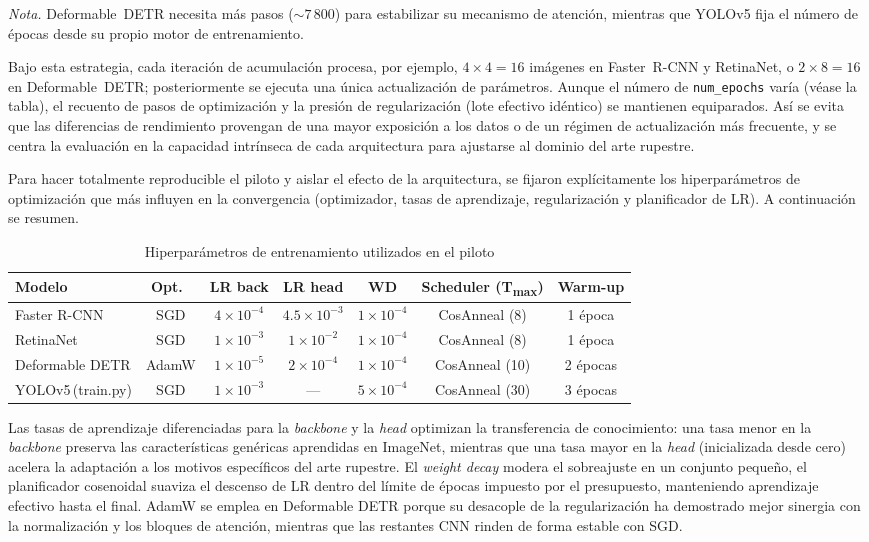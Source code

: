 \noindent\small
\textit{Nota.} Deformable~DETR necesita más pasos (\(\sim 7\,800\)) para estabilizar su mecanismo de atención, mientras que YOLOv5 fija el número de épocas desde su propio motor de entrenamiento.

\noindent
Bajo esta estrategia, cada iteración de acumulación procesa, por ejemplo, \(4 \times 4 = 16\) imágenes en Faster~R-CNN y RetinaNet, o \(2 \times 8 = 16\) en Deformable~DETR; posteriormente se ejecuta una única actualización de parámetros.
Aunque el número de \texttt{num\_epochs} varía (véase la tabla), el recuento de pasos de optimización y la presión de regularización (lote efectivo idéntico) se mantienen equiparados.
Así se evita que las diferencias de rendimiento provengan de una mayor exposición a los datos o de un régimen de actualización más frecuente, y se centra la evaluación en la capacidad intrínseca de cada arquitectura para ajustarse al dominio del arte rupestre.

Para hacer totalmente reproducible el piloto y aislar el efecto de la arquitectura, se fijaron explícitamente los hiperparámetros de optimización que más influyen en la convergencia (optimizador, tasas de aprendizaje, regularización y planificador de LR).  A continuación se resumen.

\begin{table}[!h]
\centering
\caption{Hiperparámetros de entrenamiento utilizados en el piloto}
\label{tab:pilot_hparams}
\begin{tabular}{lcccccc}
\hline
\textbf{Modelo} & Opt.\ & LR back & LR head & WD & Scheduler (T\textsubscript{max}) & Warm-up \\
\hline
Faster R-CNN         & SGD   & $4\times10^{-4}$ & $4.5\times10^{-3}$ & $1\times10^{-4}$ & CosAnneal (8)  & 1 época \\
RetinaNet            & SGD   & $1\times10^{-3}$ & $1\times10^{-2}$   & $1\times10^{-4}$ & CosAnneal (8)  & 1 época \\
Deformable DETR      & AdamW & $1\times10^{-5}$ & $2\times10^{-4}$   & $1\times10^{-4}$ & CosAnneal (10) & 2 épocas \\
YOLOv5\,(train.py)   & SGD   & $1\times10^{-3}$ & —                 & $5\times10^{-4}$ & CosAnneal (30) & 3 épocas \\
\hline
\end{tabular}
\end{table}

\noindent
Las tasas de aprendizaje diferenciadas para la \emph{backbone} y la \emph{head} optimizan la transferencia de conocimiento: una tasa menor en la \emph{backbone} preserva las características genéricas aprendidas en ImageNet, mientras que una tasa mayor en la \emph{head} (inicializada desde cero) acelera la adaptación a los motivos específicos del arte rupestre.
El \textit{weight decay} modera el sobreajuste en un conjunto pequeño, el planificador cosenoidal suaviza el descenso de LR dentro del límite de épocas impuesto por el presupuesto, manteniendo aprendizaje efectivo hasta el final.
AdamW se emplea en Deformable DETR porque su desacople de la regularización ha demostrado mejor sinergia con la normalización y los bloques de atención, mientras que las restantes CNN rinden de forma estable con SGD.

